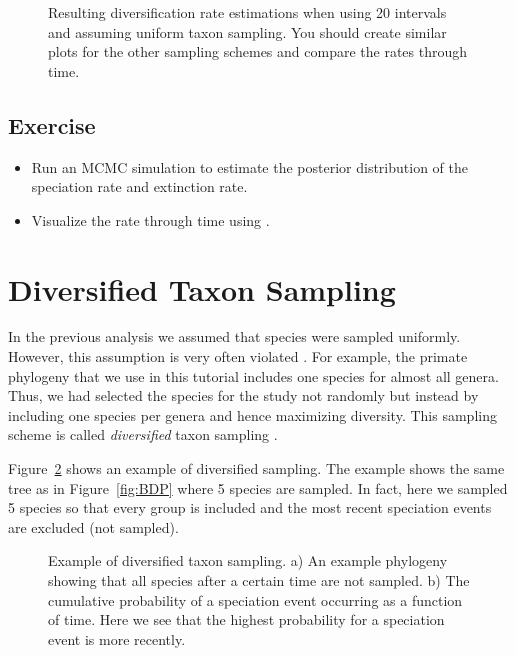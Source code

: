 
\begin{figure}[h!]
\centering
{}
\caption{\small Resulting diversification rate estimations when using 20 intervals and assuming uniform taxon sampling. You should create similar plots for the other sampling schemes and compare the rates through time.}
\label{fig:EBD_Results}
\end{figure}

\subsection{Exercise}

\begin{itemize}
\item Run an MCMC simulation to estimate the posterior distribution of the speciation rate and extinction rate.
\item Visualize the rate through time using \R.
\end{itemize}



\newpage
\section{Diversified Taxon Sampling}

In the previous analysis we assumed that species were sampled uniformly.
However, this assumption is very often violated \citep{Hoehna2011}.
For example, the primate phylogeny that we use in this tutorial includes one species for almost all genera.
Thus, we had selected the species for the study not randomly but instead by including one species per genera and hence maximizing diversity.
This sampling scheme is called \emph{diversified} taxon sampling \citep{Hoehna2011}.

Figure~\ref{fig:DiversifiedSampling} shows an example of diversified sampling.
The example shows the same tree as in Figure~\ref{fig:BDP} where 5 species are sampled.
In fact, here we sampled 5 species so that every group is included and the most recent speciation events are excluded (not sampled).

\begin{figure}[h!]
\centering
{}
\caption{\small Example of diversified taxon sampling. a) An example phylogeny showing that all species after a certain time are not sampled. b) The cumulative probability of a speciation event occurring as a function of time. Here we see that the highest probability for a speciation event is more recently.}
\label{fig:DiversifiedSampling}
\end{figure}

